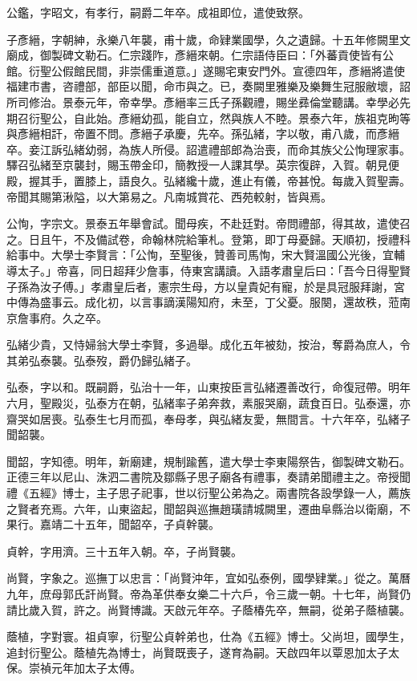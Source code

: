\begin{pinyinscope}
公鑑，字昭文，有孝行，嗣爵二年卒。成祖即位，遣使致祭。

子彥縉，字朝紳，永樂八年襲，甫十歲，命肄業國學，久之遺歸。十五年修闕里文廟成，御製碑文勒石。仁宗踐阼，彥縉來朝。仁宗語侍臣曰：「外蕃貢使皆有公館。衍聖公假館民間，非崇儒重道意。」遂賜宅東安門外。宣德四年，彥縉將遣使福建市書，咨禮部，部臣以聞，命市與之。已，奏闕里雅樂及樂舞生冠服敝壞，詔所司修治。景泰元年，帝幸學。彥縉率三氏子孫觀禮，賜坐彞倫堂聽講。幸學必先期召衍聖公，自此始。彥縉幼孤，能自立，然與族人不睦。景泰六年，族祖克昫等與彥縉相訐，帝置不問。彥縉子承慶，先卒。孫弘緒，字以敬，甫八歲，而彥縉卒。妾江訴弘緒幼弱，為族人所侵。詔遣禮部郎為治喪，而命其族父公恂理家事。驛召弘緒至京襲封，賜玉帶金印，簡教授一人課其學。英宗復辟，入賀。朝見便殿，握其手，置膝上，語良久。弘緒纔十歲，進止有儀，帝甚悅。每歲入賀聖壽。帝聞其賜第湫隘，以大第易之。凡南城賞花、西苑較射，皆與焉。

公恂，字宗文。景泰五年舉會試。聞母疾，不赴廷對。帝問禮部，得其故，遣使召之。日且午，不及備試卷，命翰林院給筆札。登第，即丁母憂歸。天順初，授禮科給事中。大學士李賢言：「公恂，至聖後，贊善司馬恂，宋大賢溫國公光後，宜輔導太子。」帝喜，同日超拜少詹事，侍東宮講讀。入語孝肅皇后曰：「吾今日得聖賢子孫為汝子傅。」孝肅皇后者，憲宗生母，方以皇貴妃有寵，於是具冠服拜謝，宮中傳為盛事云。成化初，以言事謫漢陽知府，未至，丁父憂。服闋，還故秩，蒞南京詹事府。久之卒。

弘緒少貴，又恃婦翁大學士李賢，多過舉。成化五年被劾，按治，奪爵為庶人，令其弟弘泰襲。弘泰歿，爵仍歸弘緒子。

弘泰，字以和。既嗣爵，弘治十一年，山東按臣言弘緒遷善改行，命復冠帶。明年六月，聖殿災，弘泰方在朝，弘緒率子弟奔救，素服哭廟，蔬食百日。弘泰還，亦齋哭如居喪。弘泰生七月而孤，奉母孝，與弘緒友愛，無間言。十六年卒，弘緒子聞韶襲。

聞韶，字知德。明年，新廟建，規制踰舊，遣大學士李東陽祭告，御製碑文勒石。正德三年以尼山、洙泗二書院及鄒縣子思子廟各有禮事，奏請弟聞禮主之。帝授聞禮《五經》博士，主子思子祀事，世以衍聖公弟為之。兩書院各設學錄一人，薦族之賢者充焉。六年，山東盜起，聞韶與巡撫趙璜請城闕里，遷曲阜縣治以衛廟，不果行。嘉靖二十五年，聞韶卒，子貞幹襲。

貞幹，字用濟。三十五年入朝。卒，子尚賢襲。

尚賢，字象之。巡撫丁以忠言：「尚賢沖年，宜如弘泰例，國學肄業。」從之。萬曆九年，庶母郭氏訐尚賢。帝為革供奉女樂二十六戶，令三歲一朝。十七年，尚賢仍請比歲入賀，許之。尚賢博識。天啟元年卒。子蔭椿先卒，無嗣，從弟子蔭植襲。

蔭植，字對寰。祖貞寧，衍聖公貞幹弟也，仕為《五經》博士。父尚坦，國學生，追封衍聖公。蔭植先為博士，尚賢既喪子，遂育為嗣。天啟四年以覃恩加太子太保。崇禎元年加太子太傅。


\end{pinyinscope}
